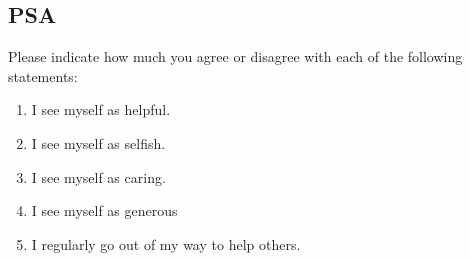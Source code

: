 \documentclass[stu,floatsintext]{apa7}
\begin{document}
\subsection{PSA \parencite{grant_giving_2008,gneezy_paying_2012}} \label{app:psa}
Please indicate how much you agree or disagree with each of the following statements:
\begin{enumerate}
    \item I see myself as helpful.
    \item I see myself as selfish.
    \item I see myself as caring.
    \item I see myself as generous
    \item I regularly go out of my way to help others.
\end{enumerate}
\end{document}
